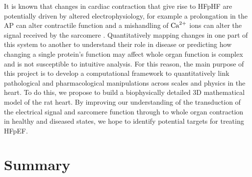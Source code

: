 \vspace{0.2cm}
It is known that changes in cardiac contraction that give rise to HFpHF are potentially driven by altered electrophysiology, for example a prolongation in the AP can alter contractile function and a mishandling of $\textrm{Ca}^{2+}$ ions can alter the signal received by the sarcomere \cite{Asp:2013, Gorski:2015}. Quantitatively mapping changes in one part of this system to another to understand their role in disease or predicting how changing a single protein's function may affect whole organ function is complex and is not susceptible to intuitive analysis. For this reason, the main purpose of this project is to develop a computational framework to quantitatively link pathological and pharmacological manipulations across scales and physics in the heart. To do this, we propose to build a biophysically detailed $3$D mathematical model of the rat heart. By improving our understanding of the transduction of the electrical signal and sarcomere function through to whole organ contraction in healthy and diseased states, we hope to identify potential targets for treating HFpEF.





%
%
%
\section{Summary}\label{sec:ch1summary}









